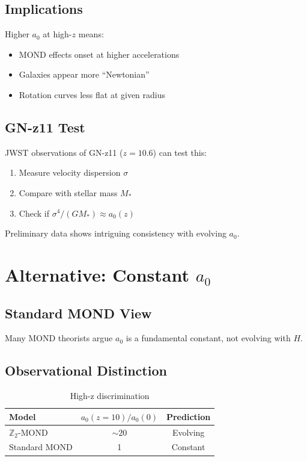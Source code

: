 \documentclass[12pt,a4paper]{article}
\begin{document}
\subsection{Implications}

Higher $a_0$ at high-$z$ means:
\begin{itemize}
    \item MOND effects onset at higher accelerations
    \item Galaxies appear more ``Newtonian''
    \item Rotation curves less flat at given radius
\end{itemize}

\subsection{GN-z11 Test}

JWST observations of GN-z11 ($z = 10.6$) can test this:
\begin{enumerate}
    \item Measure velocity dispersion $\sigma$
    \item Compare with stellar mass $M_*$
    \item Check if $\sigma^4/(GM_*) \approx a_0(z)$
\end{enumerate}

Preliminary data shows intriguing consistency with evolving $a_0$.

\section{Alternative: Constant $a_0$}

\subsection{Standard MOND View}

Many MOND theorists argue $a_0$ is a fundamental constant, not evolving with $H$.

\subsection{Observational Distinction}

\begin{table}[h]
\centering
\begin{tabular}{lcc}
\toprule
Model & $a_0(z=10)/a_0(0)$ & Prediction \\
\midrule
$\mathbb{Z}_2$-MOND & $\sim 20$ & Evolving \\
Standard MOND & 1 & Constant \\
\bottomrule
\end{tabular}
\caption{High-z discrimination}
\end{table}
\end{document}
